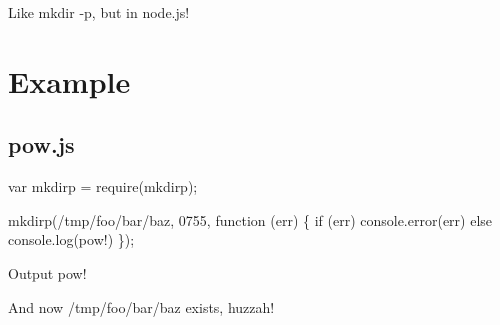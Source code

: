 Like {\ttfamily mkdir -\/p}, but in node.\+js!

\section*{Example }

\subsection*{pow.\+js }

var mkdirp = require(\textquotesingle{}mkdirp\textquotesingle{});

mkdirp(\textquotesingle{}/tmp/foo/bar/baz\textquotesingle{}, 0755, function (err) \{ if (err) console.\+error(err) else console.\+log(\textquotesingle{}pow!\textquotesingle{}) \});

Output pow!

And now /tmp/foo/bar/baz exists, huzzah! 